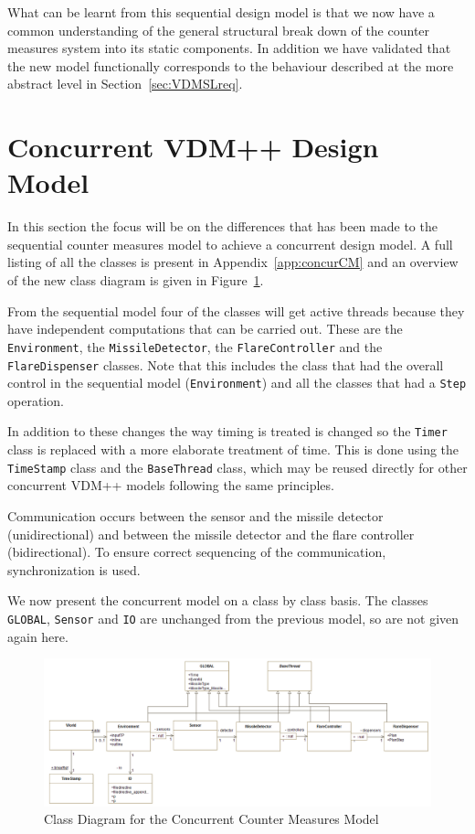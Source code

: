 \documentclass{overturerepchap}
\begin{document}
What can be learnt from this sequential design model is
that we now have a common understanding of the general structural
break down of the counter measures system into its static
components. In addition we have validated that the new model
functionally corresponds to the behaviour described at the more
abstract level in Section~\ref{sec:VDMSLreq}. 

\section{Concurrent VDM++ Design Model}\label{sec:concurmod}

In this section the focus will be on the differences that has been
made to the sequential counter measures model to achieve a concurrent
design model. A full listing of all the classes is present in 
Appendix~\ref{app:concurCM} and an overview of the new class diagram
is given in Figure~\ref{fig:classdiagconcur}.

From the sequential model four of the classes will get active threads
because they have independent computations that can be carried
out. These are the \texttt{Environment}, the
\texttt{Missile\-Detector}, the \texttt{FlareController} and the
\texttt{FlareDispenser} classes. Note that this includes the class 
that had the overall control in the sequential model (\texttt{Environment}) 
and all the classes that had a \texttt{Step} operation.

In addition to these changes the way timing is treated is changed so
the \texttt{Timer} class is replaced with a more elaborate treatment
of time. This is done using the
\texttt{TimeStamp} class and the \texttt{BaseThread} class, 
which may be reused directly for other 
concurrent VDM++ models following the same principles.

Communication occurs between the sensor and the missile detector
(unidirectional) and between the missile detector and the flare
controller (bidirectional). To ensure correct sequencing of the
communication, synchronization is used.

We now present the concurrent model on a class by class basis. The
classes \texttt{GLOBAL}, \texttt{Sensor} and \texttt{IO} 
are unchanged from the
previous model, so are not given again here.

\begin{figure}
\begin{center}
\includegraphics[width=\textwidth]{figures/concurCMclassdiag.png}
\end{center}
\caption{Class Diagram for the Concurrent Counter Measures Model\label{fig:classdiagconcur}}
\end{figure}
\end{document}

